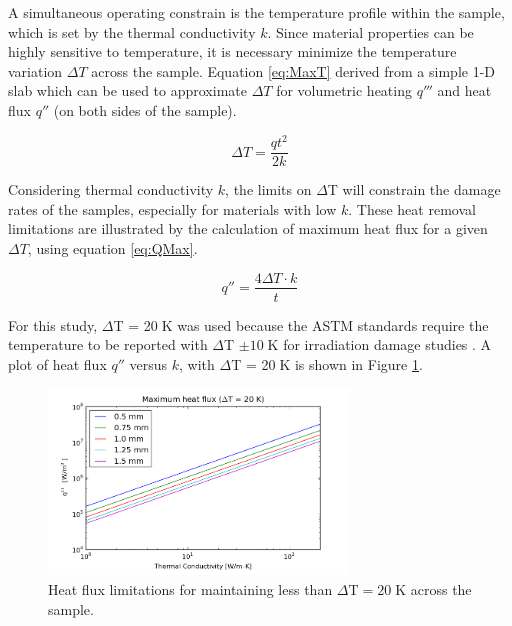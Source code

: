 \documentclass[final,3p,times,twocolumn]{elsarticle} %
\begin{document}
A simultaneous operating constrain is the temperature profile within the sample, which is set by the thermal conductivity $k$.  Since material properties can be highly sensitive to temperature, it is necessary minimize the temperature variation $\Delta T$ across the sample.  Equation \ref {eq:MaxT} derived from a simple 1-D slab which can be used to approximate $\Delta T$ for volumetric heating $q'''$ and heat flux $q''$ (on both sides of the sample).

\begin{equation}
\Delta T = \frac{q t^2}{2 k} %
\label{eq:MaxT}
\end{equation}



Considering thermal conductivity $k$, the limits on $\Delta$T will constrain the damage rates of the samples, especially for materials with low $k$.  These heat removal limitations are illustrated by the calculation of maximum heat flux for a given $\Delta T$, using equation \ref{eq:QMax}.

\begin{equation} 
q'' = \frac{4 \Delta T \cdot k}{t} 
\label{eq:QMax}
\end{equation} 

For this study,  $\Delta$T = 20$\;$K was used because the ASTM standards require the temperature to be reported with $\Delta $T $\pm 10\;$K for irradiation damage studies \cite{ASTME521}.  A plot of heat flux $q''$ versus $k$, with $\Delta$T = 20$\;$K is shown in Figure \ref{fig:MaxQ}.
 
\begin{figure}[htbp]
\begin{center}
\includegraphics[width=80mm]{Figures/MaxQFluxVsK.png}
\caption{Heat flux limitations for maintaining less than $\Delta\mathrm{T} = 20\;$K across the sample.}
\label{fig:MaxQ}
\end{center}
\end{figure}
\end{document}
